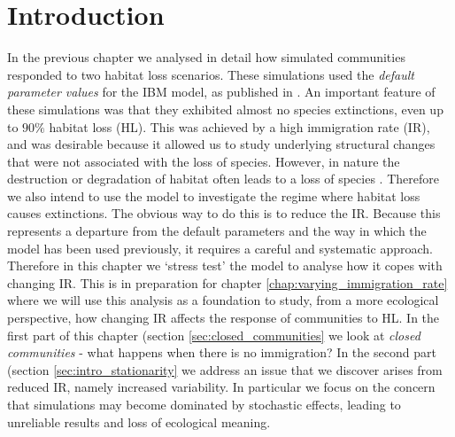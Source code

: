 

\section{Introduction}

In the previous chapter we analysed in detail how simulated communities responded to two habitat loss scenarios. These simulations used the \emph{default parameter values} for the IBM model, as published in \cite{lurgi2015effects}. An important feature of these simulations was that they exhibited almost no species extinctions, even up to $90\%$ habitat loss (HL). This was achieved by a high immigration rate (IR), and was desirable because it allowed us to study underlying structural changes that were not associated with the loss of species. However, in nature the destruction or degradation of habitat often leads to a loss of species \cite{newbold2015global, foley2005global}. Therefore we also intend to use the model to investigate the regime where habitat loss causes extinctions. The obvious way to do this is to reduce the IR. Because this represents a departure from the default parameters and the way in which the model has been used previously, it requires a careful and systematic approach. Therefore in this chapter we `stress test' the model to analyse how it copes with changing IR. This is in preparation for chapter \ref{chap:varying_immigration_rate} where we will use this analysis as a foundation to study, from a more ecological perspective, how changing IR affects the response of communities to HL. In the first part of this chapter (section \ref{sec:closed_communities} we look at \emph{closed communities} - what happens when there is no immigration? In the second part (section \ref{sec:intro_stationarity} we address an issue that we discover arises from reduced IR, namely increased variability. In particular we focus on the concern that simulations may become dominated by stochastic effects, leading to unreliable results and loss of ecological meaning.

